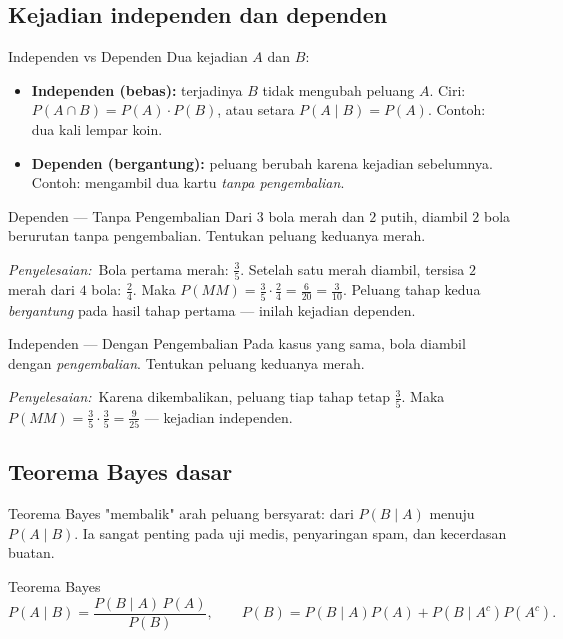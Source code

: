 \documentclass[11pt,a4paper]{report}
\theoremstyle{gaya}
\newcommand{\jawab}{\par\smallskip\noindent\textit{\textcolor{oranye}{Penyelesaian:}}\ }
\begin{document}
\subsection*{Kejadian independen dan dependen}
\begin{konsep}{Independen vs Dependen}
Dua kejadian $A$ dan $B$:
\begin{itemize}[leftmargin=*,topsep=2pt]
  \item \textbf{Independen (bebas):} terjadinya $B$ tidak mengubah peluang $A$. Ciri: $P(A\cap B)=P(A)\cdot P(B)$, atau setara $P(A\mid B)=P(A)$. Contoh: dua kali lempar koin.
  \item \textbf{Dependen (bergantung):} peluang berubah karena kejadian sebelumnya. Contoh: mengambil dua kartu \emph{tanpa pengembalian}.
\end{itemize}
\end{konsep}

\begin{contoh}{Dependen --- Tanpa Pengembalian}
Dari $3$ bola merah dan $2$ putih, diambil $2$ bola berurutan tanpa pengembalian. Tentukan peluang keduanya merah.

\jawab Bola pertama merah: $\tfrac35$. Setelah satu merah diambil, tersisa $2$ merah dari $4$ bola: $\tfrac24$. Maka $P(MM)=\tfrac35\cdot\tfrac24=\tfrac{6}{20}=\tfrac{3}{10}$. Peluang tahap kedua \emph{bergantung} pada hasil tahap pertama --- inilah kejadian dependen.
\end{contoh}

\begin{contoh}{Independen --- Dengan Pengembalian}
Pada kasus yang sama, bola diambil dengan \emph{pengembalian}. Tentukan peluang keduanya merah.

\jawab Karena dikembalikan, peluang tiap tahap tetap $\tfrac35$. Maka $P(MM)=\tfrac35\cdot\tfrac35=\tfrac{9}{25}$ --- kejadian independen.
\end{contoh}

\subsection*{Teorema Bayes dasar}
Teorema Bayes "membalik" arah peluang bersyarat: dari $P(B\mid A)$ menuju $P(A\mid B)$. Ia sangat penting pada uji medis, penyaringan spam, dan kecerdasan buatan.

\begin{konsep}{Teorema Bayes}
\[
P(A\mid B)=\frac{P(B\mid A)\,P(A)}{P(B)},\qquad
P(B)=P(B\mid A)P(A)+P(B\mid A^c)P(A^c).
\]
\end{konsep}
\end{document}
